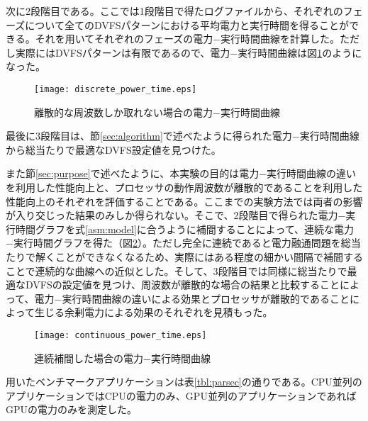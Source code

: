 次に2段階目である。ここでは1段階目で得たログファイルから、それぞれのフェーズについて全てのDVFSパターンにおける平均電力と実行時間を得ることができる。それを用いてそれぞれのフェーズの電力−実行時間曲線を計算した。ただし実際にはDVFSパターンは有限であるので、電力−実行時間曲線は図\ref{fig:discrete_power_time}のようになった。

\begin{figure}[t]
 \begin{center}
  \texttt{[image: discrete\_power\_time.eps]}
 \end{center}
 \caption{離散的な周波数しか取れない場合の電力−実行時間曲線}
 \label{fig:discrete_power_time}
\end{figure}

最後に3段階目は、節\ref{sec:algorithm}で述べたように得られた電力−実行時間曲線から総当たりで最適なDVFS設定値を見つけた。

また節\ref{sec:purpose}で述べたように、本実験の目的は電力−実行時間曲線の違いを利用した性能向上と、プロセッサの動作周波数が離散的であることを利用した性能向上のそれぞれを評価することである。ここまでの実験方法では両者の影響が入り交じった結果のみしか得られない。そこで、2段階目で得られた電力−実行時間グラフを式\ref{asm:model}に合うように補間することによって、連続な電力−実行時間グラフを得た（図\ref{fig:continuous_power_time}）。ただし完全に連続であると電力融通問題を総当たりで解くことができなくなるため、実際にはある程度の細かい間隔で補間することで連続的な曲線への近似とした。そして、3段階目では同様に総当たりで最適なDVFSの設定値を見つけ、周波数が離散的な場合の結果と比較することによって、電力−実行時間曲線の違いによる効果とプロセッサが離散的であることによって生じる余剰電力による効果のそれぞれを見積もった。

\begin{figure}[t]
 \begin{center}
  \texttt{[image: continuous\_power\_time.eps]}
 \end{center}
 \caption{連続補間した場合の電力−実行時間曲線}
 \label{fig:continuous_power_time}
\end{figure}

用いたベンチマークアプリケーションは表\ref{tbl:parsec}の通りである。CPU並列のアプリケーションではCPUの電力のみ、GPU並列のアプリケーションであればGPUの電力のみを測定した。

